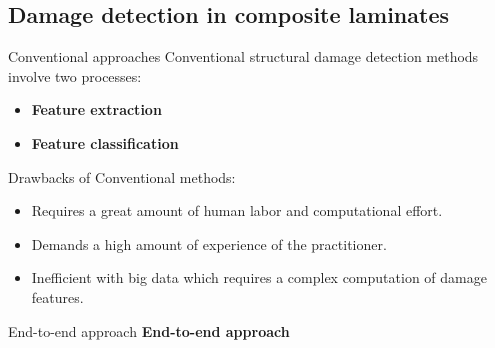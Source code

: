\documentclass[10pt,aspectratio=169]{beamer} %
\begin{document}
\subsection{Damage detection in composite laminates}
\begin{frame}{Conventional approaches}
	Conventional structural damage detection methods involve two processes:
	\begin{itemize}[<alert@+>]
		\item \textbf{Feature extraction}
		\item \textbf{Feature classification}
	\end{itemize}
	Drawbacks of Conventional methods:
	\begin{itemize}[<alert@+>]
		\item Requires a great amount of human labor and computational effort.
		\item Demands a high amount of experience of the practitioner.
		\item Inefficient with big data which requires a complex computation of damage features.
	\end{itemize}
\end{frame}
\setcounter{subfigure}{0}
\begin{frame}{End-to-end approach}
	\centering
	\textbf{End-to-end approach} 
	\par\medskip
\end{frame}
\end{document}
